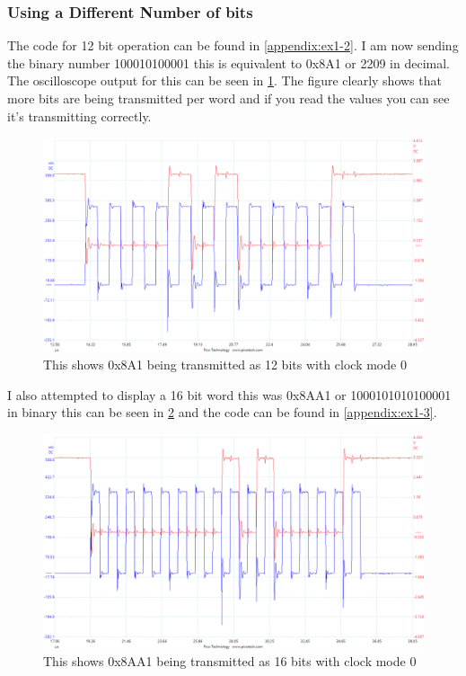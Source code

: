 \documentclass[a4paper,12pt]{scrartcl}
\begin{document}
{{			\subsubsection{Using a Different Number of bits}
			{
				The code for 12 bit operation can be found in \cref{appendix:ex1-2}. I am now sending the binary number 100010100001 this is equivalent to 0x8A1 or 2209 in decimal. The oscilloscope output for this can be seen in \cref{img:12bit0x8a1}. The figure clearly shows that more bits are being transmitted per word and if you read the values you can see it's transmitting correctly.
				\begin{figure}[h]
					\centering
					\includegraphics[width=\textwidth]{Ex1/12bit0x8a1}
					\caption{This shows 0x8A1 being transmitted as 12 bits with clock mode 0}
					\label{img:12bit0x8a1}
				\end{figure}
				I also attempted to display a 16 bit word this was 0x8AA1 or 1000101010100001 in binary this can be seen in \cref{img:16bit0x8aa1} and the code can be found in \cref{appendix:ex1-3}.
				\begin{figure}[h]
					\centering
					\includegraphics[width=\textwidth]{Ex1/16bit0x8aa1}
					\caption{This shows 0x8AA1 being transmitted as 16 bits with clock mode 0}
					\label{img:16bit0x8aa1}
				\end{figure}
			}
		}
}
\end{document}
